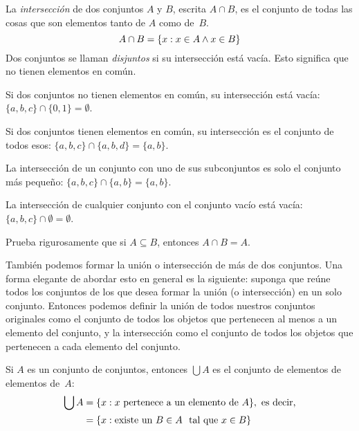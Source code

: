 \documentclass[../../../include/open-logic-section]{subfiles}
\begin{document}
\begin{defn}[Intersección]
La \emph{intersección} de dos conjuntos $A$ y $B$, escrita $A \cap B$, es el conjunto de todas las cosas que son elementos tanto de $A$ como de~$B$.
\[
A \cap B = \{ x : x \in A \land x \in B \}
\]
Dos conjuntos se llaman \emph{disjuntos} si su intersección está vacía. Esto significa que no tienen elementos en común.
\end{defn}

\begin{ex}
Si dos conjuntos no tienen elementos en común, su intersección está vacía: $\{ a, b, c\} \cap \{ 0, 1\} = \emptyset$.

Si dos conjuntos tienen elementos en común, su intersección es el conjunto de todos esos: $\{a, b, c \} \cap \{a, b, d \} = \{a, b\}$.

La intersección de un conjunto con uno de sus subconjuntos es solo el conjunto más pequeño: $\{a, b, c\} \cap \{a, b\} = \{a, b\}$.

La intersección de cualquier conjunto con el conjunto vacío está vacía: $\{a, b, c \} \cap \emptyset = \emptyset$.
\end{ex}

\begin{prob}
Prueba rigurosamente que si $A \subseteq B$, entonces $A \cap B = A$.
\end{prob}

\begin{explain}
También podemos formar la unión o intersección de más de dos conjuntos. Una forma elegante de abordar esto en general es la siguiente: suponga que reúne todos los conjuntos de los que desea formar la unión (o intersección) en un solo conjunto. Entonces podemos definir la unión de todos nuestros conjuntos originales como el conjunto de todos los objetos que pertenecen al menos a un elemento del conjunto, y la intersección como el conjunto de todos los objetos que pertenecen a cada elemento del conjunto.
\end{explain}

\begin{defn}
Si $A$ es un conjunto de conjuntos, entonces $\bigcup A$ es el conjunto de elementos de elementos de~$A$:
\begin{align*}
\bigcup A & = \Setabs{x}{x \text{ pertenece a un elemento de } A},
\text{ es decir,}\\
& = \Setabs{x}{\text{existe un } B \in A
  \text{ tal que } x \in B}
\end{align*}
\end{defn}
\end{document}
